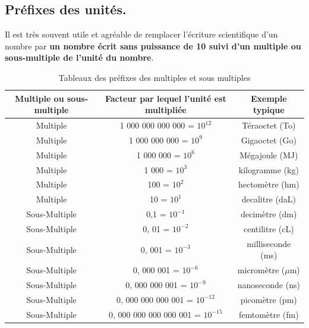 

\subsection{Préfixes des unités.}
Il est très souvent utile et agréable de remplacer l’écriture scientifique d’un nombre par \textbf{un nombre écrit sans puissance de 10 suivi d'un multiple ou sous-multiple de l'unité du nombre}.
\begin{table}[!h]
    \centering
    \begin{tabular}{|C{0.15}|c|c|}
    \hline
    Multiple ou sous-multiple & Facteur par lequel l'unité est multipliée & Exemple typique \\ 
    \hline 
    Multiple & 1 000 000 000 000 = $10^{12}$ & Téraoctet (To) \\
    \hline
    Multiple & 1 000 000 000 = $10^{9}$ & Gigaoctet (Go)\\
    \hline
    Multiple & 1 000 000 = $10^{6}$ & Mégajoule (MJ)\\
    \hline
    Multiple & 1 000 = $10^{3}$ & kilogramme (kg)\\
    \hline
    Multiple & 100 = $10^{2}$ & hectomètre (hm)\\
    \hline
    Multiple & 10 = $10^{1}$ &  decalitre (daL)\\
    \hline
    Sous-Multiple & 0,1 = $10^{-1}$ & decimètre (dm) \\
    \hline
    Sous-Multiple & 0, 01 = $10^{-2}$ & centilitre (cL) \\
    \hline
    Sous-Multiple & 0, 001 = $10^{-3}$ & milliseconde (ms) \\
    
    \hline
    Sous-Multiple & 0, 000 001 = $10^{-6}$ & micromètre ($\mu$m)\\
    \hline
    Sous-Multiple & 0, 000 000 001 = $10^{-9}$ & nanoseconde (ns) \\
    \hline
    Sous-Multiple & 0, 000 000 000 001 = $10^{-12}$ & picomètre (pm)\\
    \hline
    Sous-Multiple & 0, 000 000 000 000 001 = $10^{-15}$ & femtomètre (fm)\\
    \hline
    \end{tabular}
    
    \caption{Tableaux des préfixes des multiples et sous multiples}
    \label{tab:chap1_multiples}
\end{table}

